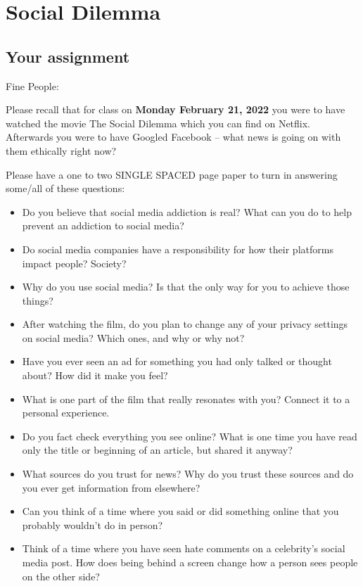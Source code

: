\documentclass[
]{book}
\providecommand{\tightlist}{%
  \setlength{\itemsep}{0pt}\setlength{\parskip}{0pt}}
\begin{document}
\hypertarget{social-dilemma}{%
\chapter{Social Dilemma}\label{social-dilemma}}

\hypertarget{your-assignment}{%
\section{Your assignment}\label{your-assignment}}

Fine People:

Please recall that for class on \textbf{Monday February 21, 2022} you were to have watched the movie The Social Dilemma which you can find on Netflix. Afterwards you were to have Googled Facebook -- what news is going on with them ethically right now?

Please have a one to two SINGLE SPACED page paper to turn in answering some/all of these questions:

\begin{itemize}
\tightlist
\item
  Do you believe that social media addiction is real? What can you do to help prevent an addiction to social media?
\item
  Do social media companies have a responsibility for how their platforms impact people? Society?
\item
  Why do you use social media? Is that the only way for you to achieve those things?
\item
  After watching the film, do you plan to change any of your privacy settings on social media? Which ones, and why or why not?
\item
  Have you ever seen an ad for something you had only talked or thought about? How did it make you feel?
\item
  What is one part of the film that really resonates with you? Connect it to a personal experience.
\item
  Do you fact check everything you see online? What is one time you have read only the title or beginning of an article, but shared it anyway?
\item
  What sources do you trust for news? Why do you trust these sources and do you ever get information from elsewhere?
\item
  Can you think of a time where you said or did something online that you probably wouldn't do in person?
\item
  Think of a time where you have seen hate comments on a celebrity's social media post. How does being behind a screen change how a person sees people on the other side?
\end{itemize}
\end{document}
